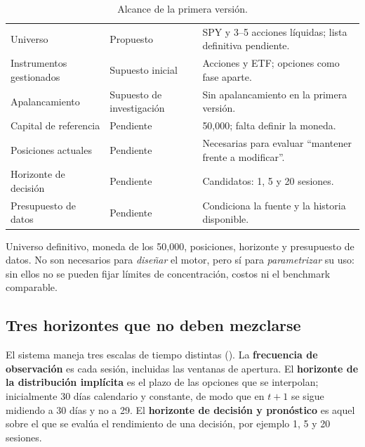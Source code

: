 \begin{table}[H]
\centering\small
\caption{Alcance de la primera versión.}
\label{tab:alcance}
\begin{tabularx}{\linewidth}{@{}l l Y@{}}
\toprule
{} &  & \\
\midrule
Universo & Propuesto & SPY y 3--5 acciones líquidas; lista definitiva pendiente.\\
Instrumentos gestionados & Supuesto inicial & Acciones y ETF; opciones como fase aparte.\\
Apalancamiento & Supuesto de investigación & Sin apalancamiento en la primera versión.\\
Capital de referencia & Pendiente & 50,000; falta definir la moneda.\\
Posiciones actuales & Pendiente & Necesarias para evaluar ``mantener frente a modificar''.\\
Horizonte de decisión & Pendiente & Candidatos: 1, 5 y 20 sesiones.\\
Presupuesto de datos & Pendiente & Condiciona la fuente y la historia disponible.\\
\bottomrule
\end{tabularx}
\end{table}

\begin{pendiente}
Universo definitivo, moneda de los 50,000, posiciones, horizonte y presupuesto de datos. No son
necesarios para \emph{diseñar} el motor, pero sí para \emph{parametrizar} su uso: sin ellos no se
pueden fijar límites de concentración, costos ni el benchmark comparable.
\end{pendiente}

\subsection{Tres horizontes que no deben mezclarse}\label{sec:horizontes}

El sistema maneja tres escalas de tiempo distintas (). La \textbf{frecuencia
de observación} es cada sesión, incluidas las ventanas de apertura. El \textbf{horizonte de la
distribución implícita} es el plazo de las opciones que se interpolan; inicialmente 30 días
calendario y constante, de modo que en $t+1$ se sigue midiendo a 30 días y no a 29. El
\textbf{horizonte de decisión y pronóstico} es aquel sobre el que se evalúa el rendimiento de una
decisión, por ejemplo 1, 5 y 20 sesiones.

